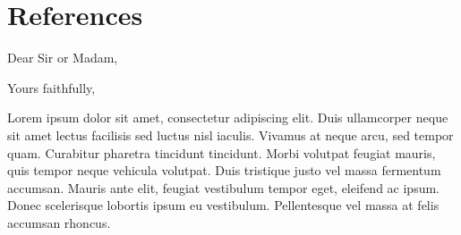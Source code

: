 \documentclass[11pt,a4paper,sans]{moderncv}        %
\begin{document}
\section{References}
\begin{cvcolumns}
\end{cvcolumns}

\nocite{*}



\clearpage
\date{January 01, 1984}
\opening{Dear Sir or Madam,}
\closing{Yours faithfully,}
\makelettertitle

Lorem ipsum dolor sit amet, consectetur adipiscing elit. Duis ullamcorper neque sit amet lectus facilisis sed luctus nisl iaculis. Vivamus at neque arcu, sed tempor quam. Curabitur pharetra tincidunt tincidunt. Morbi volutpat feugiat mauris, quis tempor neque vehicula volutpat. Duis tristique justo vel massa fermentum accumsan. Mauris ante elit, feugiat vestibulum tempor eget, eleifend ac ipsum. Donec scelerisque lobortis ipsum eu vestibulum. Pellentesque vel massa at felis accumsan rhoncus.
\end{document}
